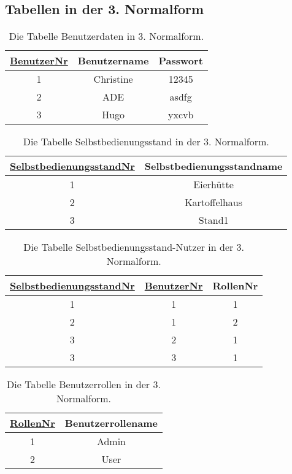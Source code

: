 \subsection *{Tabellen in der 3. Normalform}\label{Tabellen in der 3. Normalform}
\begin{table}[H]
	\begin{tabular}{|c|c|c|}
		\hline
		\underline{BenutzerNr} & Benutzername & Passwort \\
		\hline
		1 & Christine &  12345\\
		\hline
		2 & ADE &  asdfg\\
		\hline
		3 & Hugo &  yxcvb\\
		\hline
	\end{tabular}
	\caption{Die Tabelle Benutzerdaten in 3. Normalform.}
\end{table}

\begin{table}[H]
	\begin{tabular}{|c|c|}
		\hline
		\underline{SelbstbedienungsstandNr} & Selbstbedienungsstandname \\
		\hline
		1 & Eierhütte \\
		\hline
		2 & Kartoffelhaus \\
		\hline
		3 & Stand1 \\
		\hline
	\end{tabular}
	\caption{Die Tabelle Selbstbedienungsstand in der 3. Normalform.}
\end{table}

\begin{table}[H]
	\begin{tabular}{|c|c|c|}
		\hline
		\underline{SelbstbedienungsstandNr} & \underline{BenutzerNr} & RollenNr \\
		\hline
		1 & 1 &  1\\
		\hline
		2 & 1 &  2\\
		\hline
		3 & 2 &  1\\
		\hline
		3 & 3 &  1\\
		\hline
	\end{tabular}
	\caption{Die Tabelle Selbstbedienungsstand-Nutzer in der 3. Normalform.}
\end{table}

\begin{table}[H]
	\begin{tabular}{|c|c|}
		\hline
		\underline{\underline{RollenNr}} & Benutzerrollename \\
		\hline
		1 & Admin  \\
		\hline
		2 & User \\
		\hline
	\end{tabular}
	\caption{Die Tabelle Benutzerrollen in der 3. Normalform.}
\end{table}



